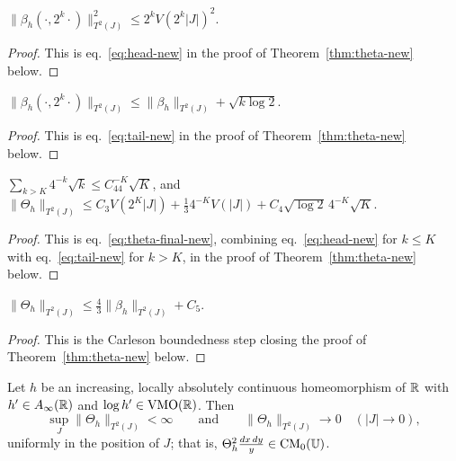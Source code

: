 \begin{lemma}\label{lem:T2norm_head_bound}
	$\|\beta_h(\cdot,2^k\cdot)\|_{T^2(J)}^2\le2^kV(2^k|J|)^2$.
\end{lemma}
\begin{proof}
	This is eq.~\eqref{eq:head-new} in the proof of Theorem~\ref{thm:theta-new} below.
\end{proof}

\begin{lemma}\label{lem:T2norm_tail_bound}
	$\|\beta_h(\cdot,2^k\cdot)\|_{T^2(J)}\le\|\beta_h\|_{T^2(J)}+\sqrt{k\log2}$.
\end{lemma}
\begin{proof}
	This is eq.~\eqref{eq:tail-new} in the proof of Theorem~\ref{thm:theta-new} below.
\end{proof}

\begin{lemma}\label{lem:T2norm_theta_split}
	$\sum_{k>K}4^{-k}\sqrt k\le C_44^{-K}\sqrt K$, and $\|\Theta_h\|_{T^2(J)}\le C_3V(2^K|J|)+\tfrac134^{-K}V(|J|)+C_4\sqrt{\log2}\,4^{-K}\sqrt K$.
\end{lemma}
\begin{proof}
	This is eq.~\eqref{eq:theta-final-new}, combining eq.~\eqref{eq:head-new} for $k\le K$ with eq.~\eqref{eq:tail-new} for $k>K$, in the proof of Theorem~\ref{thm:theta-new} below.
\end{proof}

\begin{lemma}\label{lem:T2norm_theta_propagation}
	$\|\Theta_h\|_{T^2(J)}\le\tfrac43\|\beta_h\|_{T^2(J)}+C_5$.
\end{lemma}
\begin{proof}
	This is the Carleson boundedness step closing the proof of Theorem~\ref{thm:theta-new} below.
\end{proof}

\begin{theorem}\label{thm:theta-new}
	Let $h$ be an increasing, locally absolutely continuous homeomorphism of $\mathbb{R}$
	with $h'\in A_\infty(\mathbb{R})$ and $\log h'\in\mathrm{VMO}(\mathbb{R})$. Then
	\[
	\sup_J\|\Theta_h\|_{T^2(J)}<\infty
	\qquad\text{and}\qquad
	\|\Theta_h\|_{T^2(J)}\longrightarrow0\quad(|J|\to0),
	\]
	uniformly in the position of $J$; that is,
	$\Theta_h^2\frac{dx\,dy}{y}\in\mathrm{CM}_0(\mathbb{U})$.
\end{theorem}

